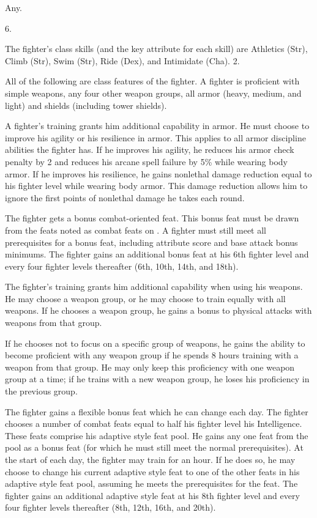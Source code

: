  Any.

 6.

The fighter's class skills (and the key attribute for each skill) are Athletics (Str), Climb (Str), Swim (Str), Ride (Dex), and Intimidate (Cha).
 2.

All of the following are class features of the fighter.
   A fighter is proficient with simple weapons, any four other weapon groups,  all armor (heavy, medium, and light) and shields (including tower shields).

 A fighter's training grants him additional capability in armor. He must choose to improve his agility or his resilience in armor. This applies to all armor discipline abilities the fighter has. If he improves his agility, he reduces his armor check penalty by 2 and reduces his arcane spell failure by 5\% while wearing body armor. If he improves his resilience, he gains nonlethal damage reduction equal to his fighter level while wearing body armor. This damage reduction allows him to ignore the first points of nonlethal damage he takes each round.

 The fighter gets a bonus combat-oriented feat. This bonus feat must be drawn from the feats noted as combat feats on . A fighter must still meet all prerequisites for a bonus feat, including attribute score and base attack bonus minimums. The fighter gains an additional bonus feat at his 6th fighter level and every four fighter levels thereafter (6th, 10th, 14th, and 18th).

 The fighter's training grants him additional capability when using his weapons. He may choose a weapon group, or he may choose to train equally with all weapons. If he chooses a weapon group, he gains a  bonus to physical attacks with weapons from that group.
\par If he chooses not to focus on a specific group of weapons, he gains the ability to become proficient with any weapon group if he spends 8 hours training with a weapon from that group. He may only keep this proficiency with one weapon group at a time; if he trains with a new weapon group, he loses his proficiency in the previous group.

 The fighter gains a flexible bonus feat which he can change each day. The fighter chooses a number of combat feats equal to half his fighter level \add his Intelligence. These feats comprise his adaptive style feat pool. He gains any one feat from the pool as a bonus feat (for which he must still meet the normal prerequisites). At the start of each day, the fighter may train for an hour. If he does so, he may choose to change his current adaptive style feat to one of the other feats in his adaptive style feat pool, assuming he meets the prerequisites for the feat.  The fighter gains an additional adaptive style feat at his 8th fighter level and every four fighter levels thereafter (8th, 12th, 16th, and 20th).


